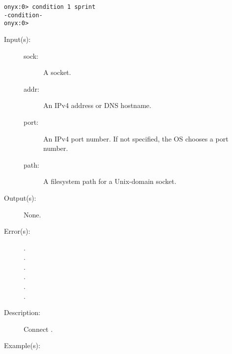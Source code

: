 \begin{description}
\begin{description}
\begin{verbatim}
onyx:0> condition 1 sprint
-condition-
onyx:0>
		\end{verbatim}
	\end{description}
\label{systemdict:connect}
\item[{\onyxop{sock addr port}{connect}{--}}: ]
\item[{\onyxop{sock path}{connect}{--}}: ]
	\begin{description}\item[]
	\item[Input(s): ]
		\begin{description}\item[]
		\item[sock: ]
			A socket.
		\item[addr: ]
			An IPv4 address or DNS hostname.
		\item[port: ]
			An IPv4 port number.  If not specified, the OS chooses a
			port number.
		\item[path: ]
			A filesystem path for a Unix-domain socket.
		\end{description}
	\item[Output(s): ] None.
	\item[Error(s): ]
		\begin{description}\item[]
		\item[.]
		\item[.]
		\item[.]
		\item[.]
		\item[.]
		\item[.]
		\end{description}
	\item[Description: ]
		Connect .
	\item[Example(s): ]\begin{verbatim}


\end{verbatim}
\end{description}
\end{description}
